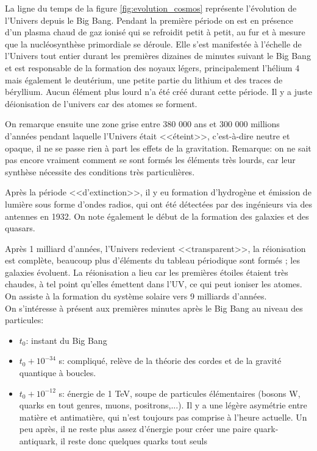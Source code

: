 La ligne du temps de la figure \ref{fig:evolution_cosmos} représente l'évolution de l'Univers depuis le Big Bang. Pendant la première période on est en présence d'un plasma chaud de gaz ionisé qui se refroidit petit à petit, au fur et à mesure que la nucléosynthèse primordiale se déroule. Elle s'est manifestée à l'échelle de l'Univers tout entier durant les premières dizaines de minutes suivant le Big Bang et est responsable de la formation des noyaux légers, principalement l'hélium 4 mais également le deutérium, une petite partie du lithium et des traces de béryllium. Aucun élément plus lourd n'a été créé durant cette période. Il y a juste déionisation de l'univers car des atomes se forment.

On remarque ensuite une zone grise entre 380 000 ans et 300 000 millions d'années pendant laquelle l'Univers était <<éteint>>, c'est-à-dire neutre et opaque, il ne se passe rien à part les effets de la gravitation. Remarque: on ne sait pas encore vraiment comment se sont formés les éléments très lourds, car leur synthèse nécessite des conditions très particulières.

Après la période <<d'extinction>>, il y eu formation d'hydrogène et émission de lumière sous forme d'ondes radios, qui ont été détectées par des ingénieurs via des antennes en 1932. On note également le début de la formation des galaxies et des quasars. 

Après 1 milliard d'années, l'Univers redevient <<transparent>>, la réionisation est complète,  beaucoup plus d'éléments du tableau périodique sont formés ; les galaxies évoluent. La réionisation a lieu car les premières étoiles étaient très chaudes, à tel point qu'elles émettent dans l'UV, ce qui peut ioniser les atomes. On assiste à la formation du système solaire vers 9 milliards d'années.\\

On s'intéresse à présent aux premières minutes après le Big Bang au niveau des particules:
\begin{itemize}
    \item $t_0$: instant du Big Bang
    \item $t_0 + 10^{-34}$ s: compliqué, relève de la théorie des cordes et de la gravité quantique à boucles.
    \item $t_0 + 10^{-12}$ s: énergie de 1 TeV, soupe de particules élémentaires (bosons W, quarks en tout genres, muons, positrons,...). Il y a une légère asymétrie entre matière et antimatière, qui n'est toujours pas comprise à l'heure actuelle. Un peu après, il ne reste plus assez d'énergie pour créer une paire quark-antiquark, il reste donc quelques quarks tout seuls
\end{itemize}

